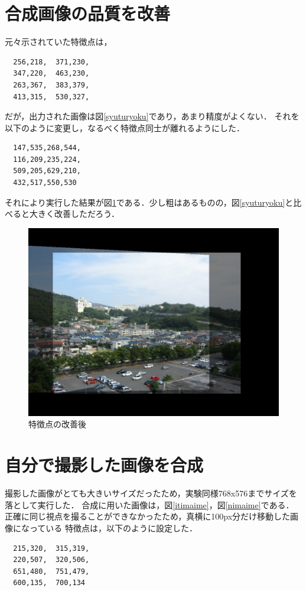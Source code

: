 \documentclass[11pt]{jarticle}
\begin{document}
\section{合成画像の品質を改善}
元々示されていた特徴点は，
\begin{verbatim}
  256,218,  371,230,
  347,220,  463,230,
  263,367,  383,379,
  413,315,  530,327,
\end{verbatim}
だが，出力された画像は図\ref{syuturyoku}であり，あまり精度がよくない．
それを以下のように変更し，なるべく特徴点同士が離れるようにした．
\begin{verbatim}
  147,535,268,544,
  116,209,235,224,
  509,205,629,210,
  432,517,550,530
\end{verbatim}

それにより実行した結果が図\ref{kaizen}である．少し粗はあるものの，図\ref{syuturyoku}と比べると大きく改善しただろう．
\begin{figure}[ht]
\centering
\includegraphics[scale=.3]{kaizen.jpg}
\caption{特徴点の改善後}
\label{kaizen}
\end{figure}

\section{自分で撮影した画像を合成}
撮影した画像がとても大きいサイズだったため，実験同様768x576までサイズを落として実行した．
合成に用いた画像は，図\ref{itimaime}，図\ref{nimaime}である．
正確に同じ視点を撮ることができなかったため，真横に100px分だけ移動した画像になっている
特徴点は，以下のように設定した．
\begin{verbatim}
  215,320,  315,319,
  220,507,  320,506,
  651,480,  751,479,
  600,135,  700,134
\end{verbatim}
\end{document}
